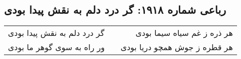 \begin{center}
\section*{رباعی شماره ۱۹۱۸: گر درد دلم به نقش پیدا بودی}
\label{sec:1918}
\begin{longtable}{l p{0.5cm} r}
گر درد دلم به نقش پیدا بودی
&&
هر ذره ز غم سیاه سیما بودی
\\
ور راه به سوی گوهر ما بودی
&&
هر قطره ز جوش همچو دریا بودی
\\
\end{longtable}
\end{center}
